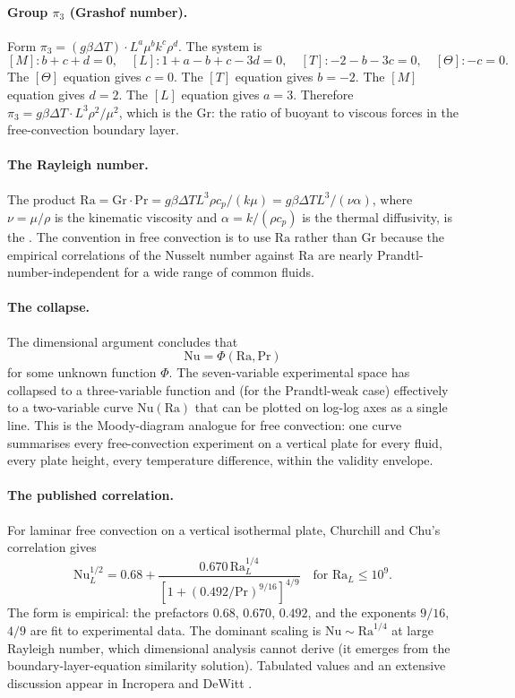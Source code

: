 \paragraph{Group $\pi_{3}$ (Grashof number).} Form $\pi_{3} = (g\beta
\Delta T) \cdot L^{a} \mu^{b} k^{c} \rho^{d}$. The system is
\[
[M]: b + c + d = 0, \quad
[L]: 1 + a - b + c - 3d = 0, \quad
[T]: -2 - b - 3c = 0, \quad
[\Theta]: -c = 0.
\]
The $[\Theta]$ equation gives $c = 0$. The $[T]$ equation gives
$b = -2$. The $[M]$ equation gives $d = 2$. The $[L]$ equation gives
$a = 3$. Therefore $\pi_{3} = g \beta \Delta T \cdot L^{3} \rho^{2}
/ \mu^{2}$, which is the  $\mathrm{Gr}$: the
ratio of buoyant to viscous forces in the free-convection boundary
layer.

\paragraph{The Rayleigh number.} The product $\mathrm{Ra} =
\mathrm{Gr} \cdot \mathrm{Pr} = g \beta \Delta T L^{3} \rho c_{p} /
(k \mu) = g \beta \Delta T L^{3} / (\nu \alpha)$, where $\nu = \mu/
\rho$ is the kinematic viscosity and $\alpha = k/(\rho c_{p})$ is the
thermal diffusivity, is the . The convention
in free convection is to use $\mathrm{Ra}$ rather than $\mathrm{Gr}$
because the empirical correlations of the Nusselt number against
$\mathrm{Ra}$ are nearly Prandtl-number-independent for a wide range
of common fluids.

\paragraph{The collapse.} The dimensional argument concludes that
\[
\mathrm{Nu} = \Phi(\mathrm{Ra}, \mathrm{Pr})
\]
for some unknown function $\Phi$. The seven-variable experimental
space has collapsed to a three-variable function and (for the
Prandtl-weak case) effectively to a two-variable curve
$\mathrm{Nu}(\mathrm{Ra})$ that can be plotted on log-log axes as a
single line. This is the Moody-diagram analogue for free convection:
one curve summarises every free-convection experiment on a vertical
plate for every fluid, every plate height, every temperature
difference, within the validity envelope.

\paragraph{The published correlation.} For laminar free convection
on a vertical isothermal plate, Churchill and Chu's correlation gives
\[
\mathrm{Nu}_{L}^{1/2}
= 0.68 + \frac{0.670 \, \mathrm{Ra}_{L}^{1/4}}
{[1 + (0.492/\mathrm{Pr})^{9/16}]^{4/9}}
\quad \text{for } \mathrm{Ra}_{L} \leq 10^{9}.
\]
The form is empirical: the prefactors $0.68$, $0.670$, $0.492$, and
the exponents $9/16$, $4/9$ are fit to experimental data. The
dominant scaling is $\mathrm{Nu} \sim \mathrm{Ra}^{1/4}$ at large
Rayleigh number, which dimensional analysis cannot derive (it
emerges from the boundary-layer-equation similarity solution).
Tabulated values and an extensive discussion appear in Incropera
and DeWitt \cite{text:incropera2007}.

